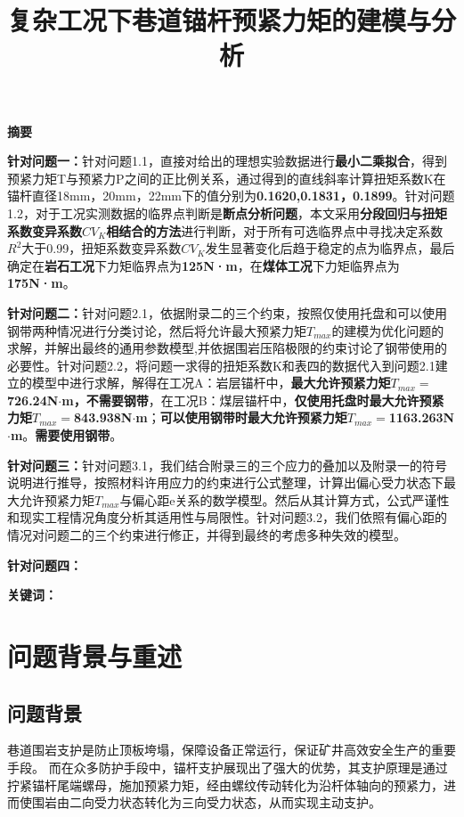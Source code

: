 \documentclass[UTF-8,a4paper,zihao=-4]{ctexart}
\makeatletter
\renewcommand{\maketitle}{
    \begin{center}
        \vspace*{-2cm}
        {\zihao{2}\heiti\@title\par}
    \end{center}
}
\renewenvironment{abstract}
{
    \begin{center}
        {\zihao{-3}\textbf{摘要}}
    \end{center}
    \zihao{-4}
}
{}
\makeatother
\begin{document}
\title{复杂工况下巷道锚杆预紧力矩的建模与分析}
\date{}
\maketitle

\begin{abstract}

    \textbf{针对问题一：}针对问题1.1，直接对给出的理想实验数据进行\textbf{最小二乘拟合}，得到预紧力矩T与预紧力P之间的正比例关系，通过得到的直线斜率计算扭矩系数K在锚杆直径18mm，20mm，22mm下的值分别为\textbf{0.1620,0.1831，0.1899}。针对问题1.2，对于工况实测数据的临界点判断是\textbf{断点分析问题}，本文采用\textbf{分段回归与扭矩系数变异系数$CV_K$相结合的方法}进行判断，对于所有可选临界点中寻找决定系数$R^2$大于0.99，扭矩系数变异系数$CV_K$发生显著变化后趋于稳定的点为临界点，最后确定在\textbf{岩石工况}下力矩临界点为\textbf{125N·m}，在\textbf{煤体工况}下力矩临界点为\textbf{175N·m}。

    \textbf{针对问题二：}针对问题2.1，依据附录二的三个约束，按照仅使用托盘和可以使用钢带两种情况进行分类讨论，然后将允许最大预紧力矩$T_{max}$的建模为优化问题的求解，并解出最终的通用参数模型,并依据围岩压陷极限的约束讨论了钢带使用的必要性。针对问题2.2，将问题一求得的扭矩系数K和表四的数据代入到问题2.1建立的模型中进行求解，解得在工况A：岩层锚杆中，\textbf{最大允许预紧力矩$T_{max}=$726.24{N$\cdot$m}，不需要钢带}，在工况B：煤层锚杆中，\textbf{仅使用托盘时最大允许预紧力矩$T_{max}=$843.938N$\cdot$m}；\textbf{可以使用钢带时最大允许预紧力矩$T_{max}=$1163.263N$\cdot$m}。\textbf{需要使用钢带}。

    \textbf{针对问题三：}针对问题3.1，我们结合附录三的三个应力的叠加以及附录一的符号说明进行推导，按照材料许用应力的约束进行公式整理，计算出偏心受力状态下最大允许预紧力矩$T_{max}$与偏心距e关系的数学模型。然后从其计算方式，公式严谨性和现实工程情况角度分析其适用性与局限性。针对问题3.2，我们依照有偏心距的情况对问题二的三个约束进行修正，并得到最终的考虑多种失效的模型。

    \textbf{针对问题四：}

\noindent \textbf{关键词：}
\end{abstract}

\newpage
\section{问题背景与重述}
\subsection{问题背景}
巷道围岩支护是防止顶板垮塌，保障设备正常运行，保证矿井高效安全生产的重要手段。 而在众多防护手段中，锚杆支护展现出了强大的优势，其支护原理是通过拧紧锚杆尾端螺母，施加预紧力矩，经由螺纹传动转化为沿杆体轴向的预紧力，进而使围岩由二向受力状态转化为三向受力状态，从而实现主动支护。
\end{document}
